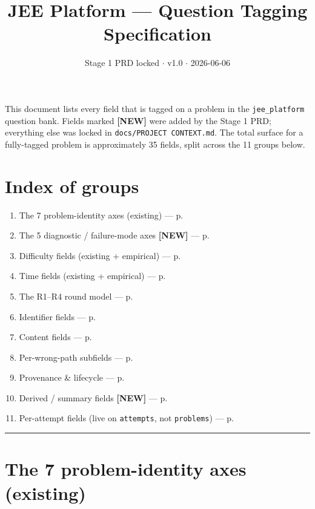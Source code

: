 \documentclass[11pt,letterpaper]{article}
\title{\huge\bfseries JEE Platform --- Question Tagging Specification\vspace{0.1cm}}
\author{}
\date{Stage 1 PRD locked $\cdot$ v1.0 $\cdot$ 2026-06-06}
\newcommand{\NEW}{\textcolor{accent}{\textbf{[NEW]}}}
\begin{document}
\vspace*{-0.8in}
\maketitle

\noindent\hrulefill
\vspace{0.3cm}

\noindent
This document lists every field that is tagged on a problem in the \texttt{jee\_platform} question bank.
Fields marked \NEW{} were added by the Stage 1 PRD; everything else was locked in \texttt{docs/PROJECT~CONTEXT.md}.
The total surface for a fully-tagged problem is approximately 35 fields, split across the 11 groups below.

\section*{Index of groups}
\begin{enumerate}\itemsep0em
  \item The 7 problem-identity axes (existing) --- p.\,\pageref{sec:identity}
  \item The 5 diagnostic / failure-mode axes \NEW{} --- p.\,\pageref{sec:diag}
  \item Difficulty fields (existing + empirical) --- p.\,\pageref{sec:diff}
  \item Time fields (existing + empirical) --- p.\,\pageref{sec:time}
  \item The R1--R4 round model --- p.\,\pageref{sec:round}
  \item Identifier fields --- p.\,\pageref{sec:id}
  \item Content fields --- p.\,\pageref{sec:content}
  \item Per-wrong-path subfields --- p.\,\pageref{sec:wrongpath}
  \item Provenance \& lifecycle --- p.\,\pageref{sec:prov}
  \item Derived / summary fields \NEW{} --- p.\,\pageref{sec:derived}
  \item Per-attempt fields (live on \texttt{attempts}, not \texttt{problems}) --- p.\,\pageref{sec:attempt}
\end{enumerate}

\bigskip
\hrule
\bigskip

\section{The 7 problem-identity axes (existing)}\label{sec:identity}
\end{document}
